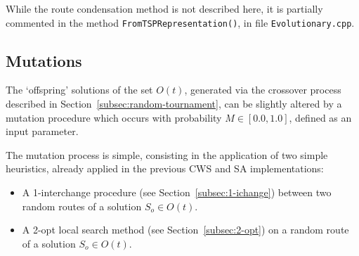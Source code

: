While the route condensation method is not described here, it is partially commented 
in the method \verb+FromTSPRepresentation()+, in file \verb+Evolutionary.cpp+.\vertbreak

\subsection{Mutations}
\label{subsec:mutations}

The `offspring' solutions of the set $O(t)$, generated via the crossover 
process described in Section~\ref{subsec:random-tournament}, can be slightly 
altered by a mutation procedure which occurs with probability 
$M \in [0.0, 1.0]$, defined as an input parameter.\vertbreak 

The mutation process is 
simple, consisting in the application of two simple heuristics, already 
applied in the previous CWS and SA implementations: 

\begin{itemize}
    \item A 1-interchange procedure (see Section~\ref{subsec:1-ichange}) between two random routes of a solution 
        $S_o \in O(t)$.
    \item A 2-opt local search method (see Section~\ref{subsec:2-opt}) on a random route 
        of a solution $S_o \in O(t)$.
\end{itemize}


